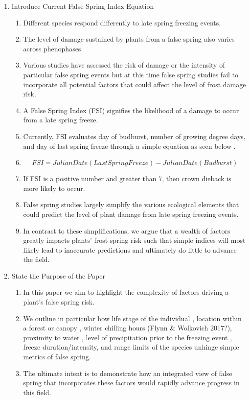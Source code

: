 \documentclass{article}\usepackage[]{graphicx}\usepackage[]{color}
\begin{document}
\begin{enumerate}
\item Introduce Current False Spring Index Equation
\begin{enumerate}
\item Different species respond differently to late spring freezing events. 
\item The level of damage sustained by plants from a false spring also varies across phenophases. 
\item Various studies have assessed the risk of damage or the intensity of particular false spring events but at this time false spring studies fail to incorporate all potential factors that could affect the level of frost damage risk. 
\item A False Spring Index (FSI) signifies the likelihood of a damage to occur from a late spring freeze. 
\item Currently, FSI evaluates day of budburst, number of growing degree days, and day of last spring freeze through a simple equation as seen below \citep{Marino2011}. 
\item \[ FSI = Julian Date (Last Spring Freeze) - Julian Date (Budburst) \]
\item If FSI is a positive number and greater than 7, then crown dieback is more likely to occur. 
\item False spring studies largely simplify the various ecological elements that could predict the level of plant damage from late spring freezing events. 
\item In contrast to these simplifications, we argue that a wealth of factors greatly impacts plants' frost spring risk such that simple indices will most likely lead to inaccurate predictions and ultimately do little to advance the field. 
\end{enumerate}

\item State the Purpose of the Paper
\begin{enumerate}
\item In this paper we aim to highlight the complexity of factors driving a plant's false spring risk. 
\item We outline in particular how life stage of the individual \citep{Caffarra2011}, location within a forest or canopy \citep{Augspurger2013}, winter chilling hours (Flynn \& Wolkovich 2017?), proximity to water \citep{Gu2008}, level of precipitation prior to the freezing event \citep{Anderegg2013}, freeze duration/intensity, and range limits of the species \citep{Martin2010} unhinge simple metrics of false spring. 
\item The ultimate intent is to demonstrate how an integrated view of false spring that incorporates these factors would rapidly advance progress in this field.  
\end{enumerate}
\end{enumerate}




\end{document}
